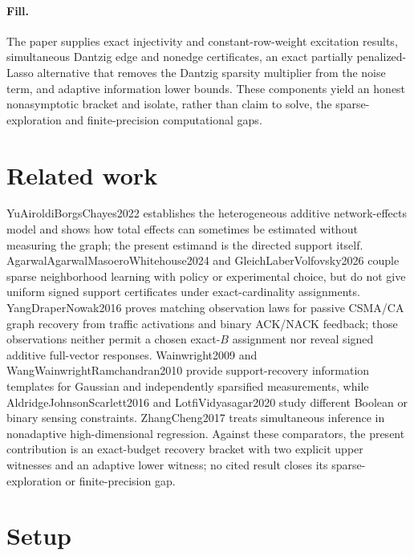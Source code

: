 \documentclass{article}
\begin{document}
\paragraph{Fill.} The paper supplies exact injectivity and constant-row-weight excitation results, simultaneous Dantzig edge and nonedge certificates, an exact partially penalized-Lasso alternative that removes the Dantzig sparsity multiplier from the noise term, and adaptive information lower bounds. These components yield an honest nonasymptotic bracket and isolate, rather than claim to solve, the sparse-exploration and finite-precision computational gaps.

\section{Related work}

YuAiroldiBorgsChayes2022 establishes the heterogeneous additive network-effects model and shows how total effects can sometimes be estimated without measuring the graph; the present estimand is the directed support itself. AgarwalAgarwalMasoeroWhitehouse2024 and GleichLaberVolfovsky2026 couple sparse neighborhood learning with policy or experimental choice, but do not give uniform signed support certificates under exact-cardinality assignments. YangDraperNowak2016 proves matching observation laws for passive CSMA/CA graph recovery from traffic activations and binary ACK/NACK feedback; those observations neither permit a chosen exact-\(B\) assignment nor reveal signed additive full-vector responses. Wainwright2009 and WangWainwrightRamchandran2010 provide support-recovery information templates for Gaussian and independently sparsified measurements, while AldridgeJohnsonScarlett2016 and LotfiVidyasagar2020 study different Boolean or binary sensing constraints. ZhangCheng2017 treats simultaneous inference in nonadaptive high-dimensional regression. Against these comparators, the present contribution is an exact-budget recovery bracket with two explicit upper witnesses and an adaptive lower witness; no cited result closes its sparse-exploration or finite-precision gap.

\section{Setup}
\end{document}

